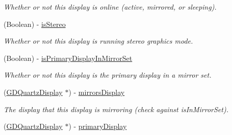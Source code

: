 \begin{DoxyCompactItemize}
\begin{DoxyCompactList}\small\item\em Whether or not this display is online (active, mirrored, or sleeping). \item\end{DoxyCompactList}\item 
\hypertarget{interface_g_d_quartz_display_afde1a1aa00226a92789bccd2a63aa349}{
(Boolean) -\/ \hyperlink{interface_g_d_quartz_display_afde1a1aa00226a92789bccd2a63aa349}{isStereo}}
\label{interface_g_d_quartz_display_afde1a1aa00226a92789bccd2a63aa349}

\begin{DoxyCompactList}\small\item\em Whether or not this display is running stereo graphics mode. \item\end{DoxyCompactList}\item 
\hypertarget{interface_g_d_quartz_display_a9b3e770afec22fd9ab1935e7f4bc49ed}{
(Boolean) -\/ \hyperlink{interface_g_d_quartz_display_a9b3e770afec22fd9ab1935e7f4bc49ed}{isPrimaryDisplayInMirrorSet}}
\label{interface_g_d_quartz_display_a9b3e770afec22fd9ab1935e7f4bc49ed}

\begin{DoxyCompactList}\small\item\em Whether or not this display is the primary display in a mirror set. \item\end{DoxyCompactList}\item 
\hypertarget{interface_g_d_quartz_display_a4fedac12c3792dbe475cbaaba74deb2c}{
(\hyperlink{interface_g_d_quartz_display}{GDQuartzDisplay} $\ast$) -\/ \hyperlink{interface_g_d_quartz_display_a4fedac12c3792dbe475cbaaba74deb2c}{mirrorsDisplay}}
\label{interface_g_d_quartz_display_a4fedac12c3792dbe475cbaaba74deb2c}

\begin{DoxyCompactList}\small\item\em The display that this display is mirroring (check against isInMirrorSet). \item\end{DoxyCompactList}\item 
\hypertarget{interface_g_d_quartz_display_a4b56a5c85db98835d9cf99ba37dd35b5}{
(\hyperlink{interface_g_d_quartz_display}{GDQuartzDisplay} $\ast$) -\/ \hyperlink{interface_g_d_quartz_display_a4b56a5c85db98835d9cf99ba37dd35b5}{primaryDisplay}}
\label{interface_g_d_quartz_display_a4b56a5c85db98835d9cf99ba37dd35b5}


\end{DoxyCompactItemize}
